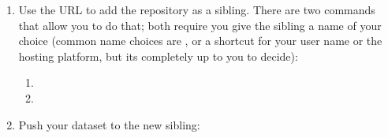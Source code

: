 \begin{enumerate}
\item {} 
\sphinxAtStartPar
Use the URL to add the repository as a sibling. There are two commands that allow you to do that; both require you give the sibling a name of your choice (common name choices are , or a short\sphinxhyphen{}cut for your user name or the hosting platform, but its completely up to you to decide):
\begin{enumerate}
%
\item {} 
\sphinxAtStartPar
{}

\item {} 
\sphinxAtStartPar
{}

\end{enumerate}

\item {} 
\sphinxAtStartPar
Push your dataset to the new sibling: 

\end{enumerate}

